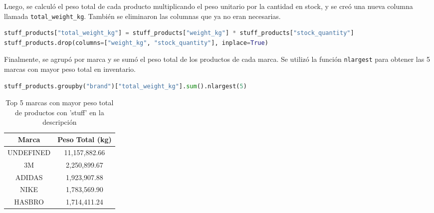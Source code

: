 Luego, se calculó el peso total de cada producto multiplicando el peso unitario por la cantidad en stock, y se creó una nueva columna llamada \texttt{total\_weight\_kg}. También se eliminaron las columnas que ya no eran necesarias.

\begin{lstlisting}[language=Python, xleftmargin=25pt, xrightmargin=25pt]
stuff_products["total_weight_kg"] = stuff_products["weight_kg"] * stuff_products["stock_quantity"]
stuff_products.drop(columns=["weight_kg", "stock_quantity"], inplace=True)
\end{lstlisting}

Finalmente, se agrupó por marca y se sumó el peso total de los productos de cada marca. Se utilizó la función \texttt{nlargest} para obtener las 5 marcas con mayor peso total en inventario.

\begin{lstlisting}[language=Python, xleftmargin=75pt, xrightmargin=75pt]
    stuff_products.groupby("brand")["total_weight_kg"].sum().nlargest(5)
\end{lstlisting}

\begin{table}[H]
\centering
\begin{tabular}{|c|c|}
\hline
\textbf{Marca} & \textbf{Peso Total (kg)} \\
\hline
UNDEFINED & 11,157,882.66 \\
3M & 2,250,899.67 \\
ADIDAS & 1,923,907.88 \\
NIKE & 1,783,569.90 \\
HASBRO & 1,714,411.24 \\
\hline
\end{tabular}
\caption{Top 5 marcas con mayor peso total de productos con 'stuff' en la descripción}
\end{table}